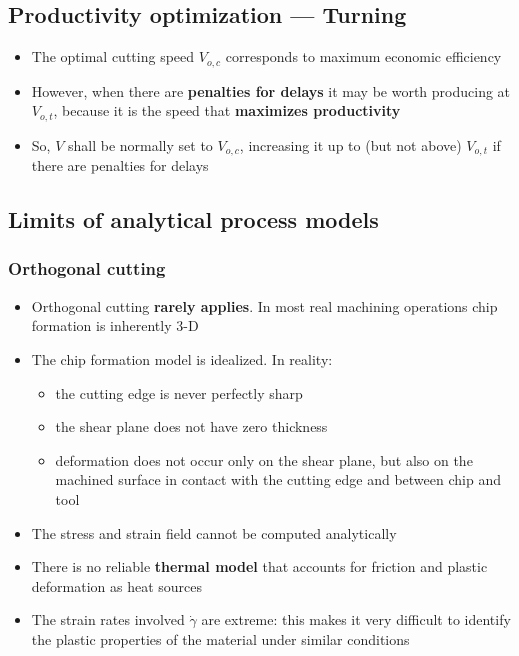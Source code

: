 \documentclass[
  letterpaper,
  DIV=11,
  numbers=noendperiod]{scrartcl}
\providecommand{\tightlist}{%
  \setlength{\itemsep}{0pt}\setlength{\parskip}{0pt}}
\begin{document}
\subsection{Productivity optimization ---
Turning}\label{productivity-optimization-turning-2}

\begin{itemize}
\tightlist
\item
  The optimal cutting speed \(V_{o,c}\) corresponds to maximum economic
  efficiency
\item
  However, when there are \textbf{penalties for delays} it may be worth
  producing at \(V_{o,t}\), because it is the speed that
  \textbf{maximizes productivity}
\item
  So, \(V\) shall be normally set to \(V_{o,c}\), increasing it up to
  (but not above) \(V_{o,t}\) if there are penalties for delays
\end{itemize}

\subsection{Limits of analytical process
models}\label{limits-of-analytical-process-models}

\subsubsection{Orthogonal cutting}\label{orthogonal-cutting}

\begin{itemize}
\tightlist
\item
  Orthogonal cutting \textbf{rarely applies}. In most real machining
  operations chip formation is inherently 3-D
\item
  The chip formation model is idealized. In reality:

  \begin{itemize}
  \tightlist
  \item
    the cutting edge is never perfectly sharp
  \item
    the shear plane does not have zero thickness
  \item
    deformation does not occur only on the shear plane, but also on the
    machined surface in contact with the cutting edge and between chip
    and tool
  \end{itemize}
\item
  The stress and strain field cannot be computed analytically
\item
  There is no reliable \textbf{thermal model} that accounts for friction
  and plastic deformation as heat sources
\item
  The strain rates involved \(\dot\gamma\) are extreme: this makes it
  very difficult to identify the plastic properties of the material
  under similar conditions
\end{itemize}
\end{document}
